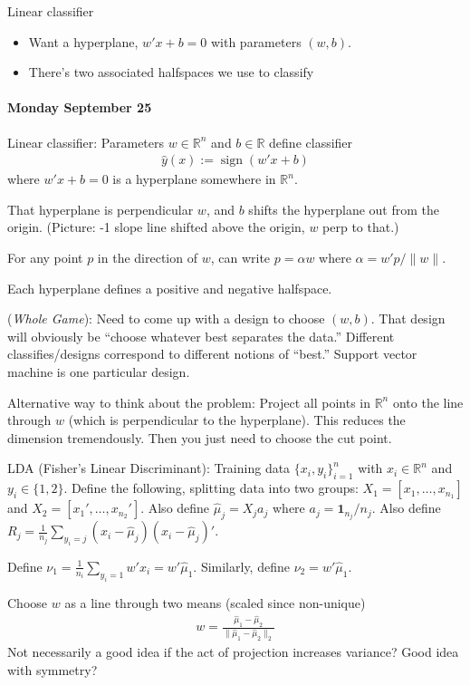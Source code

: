 \documentclass[12pt]{book}
\numberwithin{equation}{section} %
\theoremstyle{plain}
\theoremstyle{definition}
\theoremstyle{remark}
\newcommand{\R}{\mathbb{R}}
\newcommand{\Rn}{\mathbb{R}^n}
\newcommand{\sign}{\operatorname{sign}}
\begin{document}
Linear classifier
\begin{itemize}
  \item Want a hyperplane, $w'x+b=0$ with parameters $(w,b)$.
  \item There's two associated halfspaces we use to classify
\end{itemize}


\clearpage
\paragraph{Monday September 25}

Linear classifier:
Parameters $w\in\R^n$ and $b\in\R$ define classifier
\begin{align*}
  \hat{y}(x) := \sign(w'x+b)
\end{align*}
where $w'x+b=0$ is a hyperplane somewhere in $\R^n$.

That hyperplane is perpendicular $w$, and $b$ shifts the hyperplane out
from the origin.
(Picture: -1 slope line shifted above the origin, $w$ perp to that.)

For any point $p$ in the direction of $w$, can write $p=\alpha w$
where $\alpha =w'p/\lVert w\rVert$.

Each hyperplane defines a positive and negative halfspace.

(\emph{Whole Game}): Need to come up with a design to choose $(w,b)$.
That design will obviously be ``choose whatever best separates the
data.'' Different classifies/designs correspond to different notions of
``best.'' Support vector machine is one particular design.

Alternative way to think about the problem: Project all points in $\Rn$
onto the line through $w$ (which is perpendicular to the hyperplane).
This reduces the dimension tremendously.
Then you just need to choose the cut point.

LDA (Fisher's Linear Discriminant):
Training data $\{x_i,y_i\}_{i=1}^n$ with $x_i\in\R^n$ and
$y_i\in\{1,2\}$.
Define the following, splitting data into two groups:
$X_1=[x_1,\ldots,x_{n_1}]$ and $X_2=[x_1',\ldots,x_{n_2}']$.
Also define $\hat{\mu}_j=X_j a_j$ where $a_j = \mathbf{1}_{n_j}/n_j$.
Also define
$R_j = \frac{1}{n_j} \sum_{y_i=j} (x_i-\hat{\mu}_j)(x_i-\hat{\mu}_j)'$.

Define $\nu_1=\frac{1}{n_i}\sum_{y_i=1} w'x_i=w'\hat{\mu}_1$.
Similarly, define $\nu_2=w'\hat{\mu}_1$.

Choose $w$ as a line through two means (scaled since non-unique)
\begin{align*}
  w=\frac{\hat{\mu}_1-\hat{\mu}_2}{\lVert
    \hat{\mu}_1-\hat{\mu}_2\rVert_2}
\end{align*}
Not necessarily a good idea if the act of projection increases variance?
Good idea with symmetry?
\end{document}
